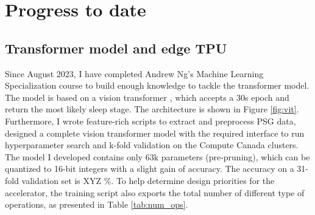 \documentclass[12pt]{article}
\begin{document}
    \begin{table}[ht]
        \centering
        \renewcommand{\arraystretch}{1.2} %
        \setlength{\arrayrulewidth}{1.5pt} %
        \caption{Design goals for AI model and ASIC accelerator}
        \label{tab:design_goals}
    \end{table}

    \section{Progress to date}
    \subsection{Transformer model and edge TPU}
    Since August 2023, I have completed Andrew Ng's Machine Learning Specialization course to build enough knowledge to tackle the transformer model. The model is based on a vision transformer \cite{dosovitskiy2010image}, which accepts a
    30s epoch and return the most likely sleep stage. The architecture is shown in Figure \ref{fig:vit}.
    Furthermore, I wrote feature-rich scripts to extract and preprocess PSG data, designed a complete vision transformer model with the required interface to run hyperparameter search and k-fold validation on the Compute Canada clusters. The model I developed contains only 63k parameters (pre-pruning),
    which can be quantized to 16-bit integers with a slight gain of accuracy. The accuracy on a 31-fold validation set is XYZ \%. To help determine design priorities for the accelerator, the training script also exports the
    total number of different type of operations, as presented in Table \ref{tab:num_ops}.
\end{document}
